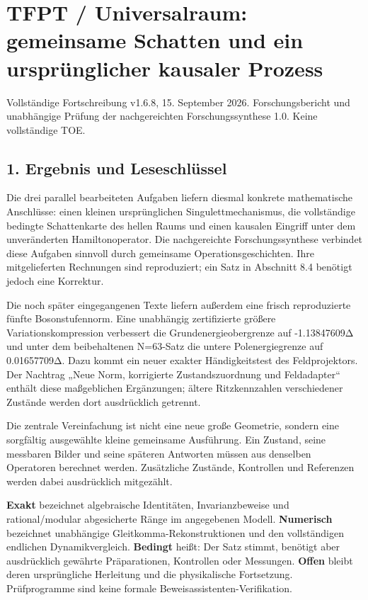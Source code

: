 

{
\setcounter{tocdepth}{2}
\tableofcontents
}
\section{TFPT / Universalraum: gemeinsame Schatten und ein
ursprünglicher kausaler
Prozess}\label{tfpt-universalraum-gemeinsame-schatten-und-ein-urspruxfcnglicher-kausaler-prozess}

Vollständige Fortschreibung v1.6.8, 15. September 2026.
Forschungsbericht und unabhängige Prüfung der nachgereichten
Forschungssynthese 1.0. Keine vollständige TOE.

\subsection{1. Ergebnis und
Leseschlüssel}\label{ergebnis-und-leseschluxfcssel}

Die drei parallel bearbeiteten Aufgaben liefern diesmal konkrete
mathematische Anschlüsse: einen kleinen ursprünglichen
Singulettmechanismus, die vollständige bedingte Schattenkarte des hellen
Raums und einen kausalen Eingriff unter dem unveränderten
Hamiltonoperator. Die nachgereichte Forschungssynthese verbindet diese
Aufgaben sinnvoll durch gemeinsame Operationsgeschichten. Ihre
mitgelieferten Rechnungen sind reproduziert; ein Satz in Abschnitt 8.4
benötigt jedoch eine Korrektur.

Die noch später eingegangenen Texte liefern außerdem eine frisch
reproduzierte fünfte Bosonstufennorm. Eine unabhängig zertifizierte
größere Variationskompression verbessert die Grundenergieobergrenze auf
-1.13847609Δ und unter dem beibehaltenen N=63-Satz die untere
Polenergiegrenze auf 0.01657709Δ. Dazu kommt ein neuer exakter
Händigkeitstest des Feldprojektors. Der Nachtrag „Neue Norm, korrigierte
Zustandszuordnung und Feldadapter`` enthält diese maßgeblichen
Ergänzungen; ältere Ritzkennzahlen verschiedener Zustände werden dort
ausdrücklich getrennt.

Die zentrale Vereinfachung ist nicht eine neue große Geometrie, sondern
eine sorgfältig ausgewählte kleine gemeinsame Ausführung. Ein Zustand,
seine messbaren Bilder und seine späteren Antworten müssen aus denselben
Operatoren berechnet werden. Zusätzliche Zustände, Kontrollen und
Referenzen werden dabei ausdrücklich mitgezählt.

\textbf{Exakt} bezeichnet algebraische Identitäten, Invarianzbeweise und
rational/modular abgesicherte Ränge im angegebenen Modell.
\textbf{Numerisch} bezeichnet unabhängige Gleitkomma-Rekonstruktionen
und den vollständigen endlichen Dynamikvergleich. \textbf{Bedingt}
heißt: Der Satz stimmt, benötigt aber ausdrücklich gewährte
Präparationen, Kontrollen oder Messungen. \textbf{Offen} bleibt deren
ursprüngliche Herleitung und die physikalische Fortsetzung.
Prüfprogramme sind keine formale Beweisassistenten-Verifikation.

